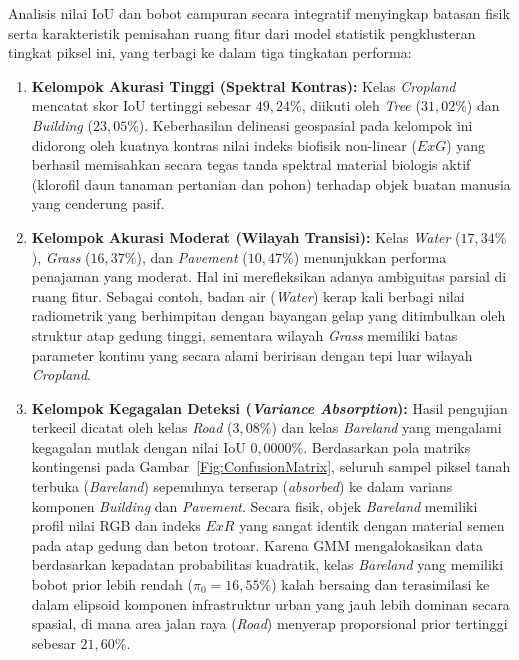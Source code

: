 \documentclass[11pt,twoside]{article}
\begin{document}
Analisis nilai IoU dan bobot campuran secara integratif menyingkap batasan fisik serta karakteristik pemisahan ruang fitur dari model statistik pengklusteran tingkat piksel ini, yang terbagi ke dalam tiga tingkatan performa:
\begin{enumerate}
    \item \textbf{Kelompok Akurasi Tinggi (Spektral Kontras):} Kelas \textit{Cropland} mencatat skor IoU tertinggi sebesar $49,24\%$, diikuti oleh \textit{Tree} ($31,02\%$) dan \textit{Building} ($23,05\%$). Keberhasilan delineasi geospasial pada kelompok ini didorong oleh kuatnya kontras nilai indeks biofisik non-linear ($ExG$) yang berhasil memisahkan secara tegas tanda spektral material biologis aktif (klorofil daun tanaman pertanian dan pohon) terhadap objek buatan manusia yang cenderung pasif.
    \item \textbf{Kelompok Akurasi Moderat (Wilayah Transisi):} Kelas \textit{Water} ($17,34\%$), \textit{Grass} ($16,37\%$), dan \textit{Pavement} ($10,47\%$) menunjukkan performa penajaman yang moderat. Hal ini merefleksikan adanya ambiguitas parsial di ruang fitur. Sebagai contoh, badan air (\textit{Water}) kerap kali berbagi nilai radiometrik yang berhimpitan dengan bayangan gelap yang ditimbulkan oleh struktur atap gedung tinggi, sementara wilayah \textit{Grass} memiliki batas parameter kontinu yang secara alami beririsan dengan tepi luar wilayah \textit{Cropland}.
    \item \textbf{Kelompok Kegagalan Deteksi (\textit{Variance Absorption}):} Hasil pengujian terkecil dicatat oleh kelas \textit{Road} ($3,08\%$) dan kelas \textit{Bareland} yang mengalami kegagalan mutlak dengan nilai IoU $0,0000\%$. Berdasarkan pola matriks kontingensi pada Gambar~\ref{Fig:ConfusionMatrix}, seluruh sampel piksel tanah terbuka (\textit{Bareland}) sepenuhnya terserap (\textit{absorbed}) ke dalam varians komponen \textit{Building} dan \textit{Pavement}. Secara fisik, objek \textit{Bareland} memiliki profil nilai RGB dan indeks $ExR$ yang sangat identik dengan material semen pada atap gedung dan beton trotoar. Karena GMM mengalokasikan data berdasarkan kepadatan probabilitas kuadratik, kelas \textit{Bareland} yang memiliki bobot prior lebih rendah ($\pi_0 = 16,55\%$) kalah bersaing dan terasimilasi ke dalam elipsoid komponen infrastruktur urban yang jauh lebih dominan secara spasial, di mana area jalan raya (\textit{Road}) menyerap proporsional prior tertinggi sebesar $21,60\%$.
\end{enumerate}

\end{document}
